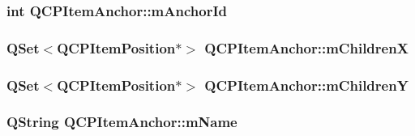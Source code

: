 \subsubsection[{m\+Anchor\+Id}]{\setlength{\rightskip}{0pt plus 5cm}int Q\+C\+P\+Item\+Anchor\+::m\+Anchor\+Id\hspace{0.3cm}{\ttfamily [protected]}}\label{class_q_c_p_item_anchor_a00c62070333e8345976b579676ad3997}
\hypertarget{class_q_c_p_item_anchor_a3c0bfd6e50f3b48e2a9b3824695b20f7}{}
\subsubsection[{m\+Children\+X}]{\setlength{\rightskip}{0pt plus 5cm}Q\+Set$<${\bf Q\+C\+P\+Item\+Position}$\ast$$>$ Q\+C\+P\+Item\+Anchor\+::m\+Children\+X\hspace{0.3cm}{\ttfamily [protected]}}\label{class_q_c_p_item_anchor_a3c0bfd6e50f3b48e2a9b3824695b20f7}
\hypertarget{class_q_c_p_item_anchor_a3abe4eebd0683454d81c8341df6f7115}{}
\subsubsection[{m\+Children\+Y}]{\setlength{\rightskip}{0pt plus 5cm}Q\+Set$<${\bf Q\+C\+P\+Item\+Position}$\ast$$>$ Q\+C\+P\+Item\+Anchor\+::m\+Children\+Y\hspace{0.3cm}{\ttfamily [protected]}}\label{class_q_c_p_item_anchor_a3abe4eebd0683454d81c8341df6f7115}
\hypertarget{class_q_c_p_item_anchor_a23ad4d0ab0d2cbb41a7baf05bcf996ec}{}
\subsubsection[{m\+Name}]{\setlength{\rightskip}{0pt plus 5cm}Q\+String Q\+C\+P\+Item\+Anchor\+::m\+Name\hspace{0.3cm}{\ttfamily [protected]}}\label{class_q_c_p_item_anchor_a23ad4d0ab0d2cbb41a7baf05bcf996ec}
\hypertarget{class_q_c_p_item_anchor_a80fad480ad3bb980446ed6ebc00818ae}{}
